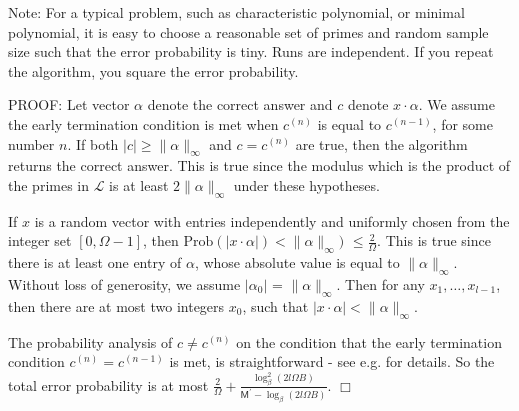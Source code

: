 \documentclass{acm_proc_article-sp}
\newcommand{\Prob}{\ensuremath{\mbox{Prob}}}
\newcommand{\QED}{\ensuremath{\Box}}
\newcommand{\abs}[1]{\ensuremath{|#1|}}
\newcommand{\pSize}{\ensuremath{\mathsf M}}
\newcommand{\rSize}{\ensuremath{\Omega}}
\def\normoo#1{\|#1\|_\infty}
\newcommand{\set}{\ensuremath{\mathcal P}}
\newcommand{\minPrime}{\ensuremath{\beta}}
\newcommand{\length}{\ensuremath{\mathit l}}
\newcommand{\List}{\ensuremath{\mathcal L}}
\begin{document}
Note: For a typical problem, such as characteristic polynomial, 
or minimal polynomial, it is easy to choose a reasonable set of primes 
and random sample size
such that the error probability is tiny.  Runs are independent. If you
repeat the algorithm, you square the error probability.

PROOF:
Let vector $\alpha$ denote the correct answer and
$c$ denote $x \cdot \alpha$. 
We assume the early termination condition is met when 
$c^{(n)}$ is equal to $c^{(n-1)}$, for some number $n$. 
If both $\abs {c} \geq \normoo {\alpha}$ and
$c = c^{(n)}$ are true, then the algorithm returns the correct answer.
This is true since the modulus which is the product of the primes in $\List$ is at least 
$2 \normoo {\alpha}$ under these hypotheses.

If $x$ is a random vector with entries 
independently and uniformly chosen from the integer set $[0, \rSize-1]$,
then $\Prob (\abs{x \cdot \alpha}) < \normoo{\alpha})$
$\leq \frac{2}{\rSize}$.
This is true since
there is at least one entry of $\alpha$, whose absolute value is
equal to $\normoo{\alpha}$.
Without loss of generosity, we assume $\abs {\alpha_0}$ = $\normoo{\alpha}$.
Then for any $x_1, \ldots, x_{\length-1}$, then there are at most two integers $x_0$, 
such that $\abs{x \cdot \alpha} < \normoo{\alpha}$.

The probability analysis of $c \not= c^{(n)}$ 
on the condition that the early termination condition $c^{(n)} = c^{(n-1)}$ is met,
is straightforward - see e.g. \cite[Theorem 1.]{Kaltofen02} for details.
So the total error probability is at most 
$\frac{2}{\rSize} +
\frac{\log^2_{\minPrime}(2\length \rSize B)}
{\pSize^\prime - \log_{\minPrime}(2\length \rSize B)}$.
%
%
%
%
%
\QED
\end{document}
